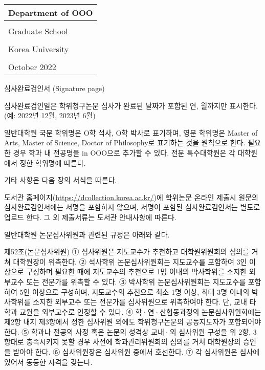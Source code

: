 \documentclass[11pt]{report}
\numberwithin{figure}{section}
\theoremstyle{plain}
\theoremstyle{definition}
\theoremstyle{corollary}
\theoremstyle{definition}
\theoremstyle{plain}
\theoremstyle{definition}
\theoremstyle{plain}
\begin{document}
\noindent
\begin{tabularx}{\textwidth}{| >{\centering\arraybackslash}X |}
\arrayrulecolor{blue}
\hline
\Large Department of OOO \\\hline
\rule{0pt}{30pt}\\\hline
\LARGE Graduate School \\\hline
\\[-8pt]\hline
\LARGE Korea University \\\hline
\rule{0pt}{20pt}\\\hline
\large October 2022 \\\hline
\end{tabularx}

\newpage
\begin{center}
\large 심사완료검인서 (Signature page)
\end{center}

심사완료검인일은 학위청구논문 심사가 완료된 날짜가 포함된 연, 월까지만 표시한다.
(예: 2022년 12월, 2023년 6월)

일반대학원 국문 학위명은 O학 석사, O학 박사로 표기하며, 영문 학위명은 Master of Arts, Master of Science, Doctor of Philosophy로 표기하는 것을 원칙으로 한다.
필요한 경우 학과 내 전공명을 in OOO으로 추가할 수 있다.
전문 특수대학원은 각 대학원에서 정한 학위명에 따른다.

기타 사항은 다음 장의 서식을 따른다. 

도서관 홈페이지(\url{https://dcollection.korea.ac.kr/})에 학위논문 온라인 제출시 원문의 심사완료검인서에는 서명을 포함하지 않으며, 서명이 포함된 심사완료검인서는 별도로 업로드 한다.
그 외 제출서류는 도서관 안내사항에 따른다.

일반대학원 논문심사위원과 관련된 규정은 아래와 같다.

\bigskip

제52조(논문심사위원)
① 심사위원은 지도교수가 추천하고 대학원위원회의 심의를 거쳐 대학원장이 위촉한다.
② 석사학위 논문심사위원회는 지도교수를 포함하여 3인 이상으로 구성하며 필요한 때에 지도교수의 추천으로 1명 이내의 박사학위를 소지한 외부교수 또는 전문가를 위촉할 수 있다.
③ 박사학위 논문심사위원회는 지도교수를 포함하여 5인 이상으로 구성하며, 지도교수의 추천으로 최소 1명 이상, 최대 3명 이내의 박사학위를 소지한 외부교수 또는 전문가를 심사위원으로 위촉하여야 한다.
단, 교내 타학과 교원을 외부교수로 인정할 수 있다.
④ 학·연·산협동과정의 논문심사위원회에는 제2항 내지 제3항에서 정한 심사위원 외에도 학위청구논문의 공동지도자가 포함되어야 한다.
⑤ 학과나 전공의 사정 혹은 논문의 성격상 교내·외 심사위원 구성을 위 2항, 3항대로 충족시키지 못할 경우 사전에 학과관리위원회의 심의를 거쳐 대학원장의 승인을 받아야 한다.
⑥ 심사위원장은 심사위원 중에서 호선한다.
⑦ 각 심사위원은 심사에 있어서 동등한 자격을 갖는다.
\end{document}
